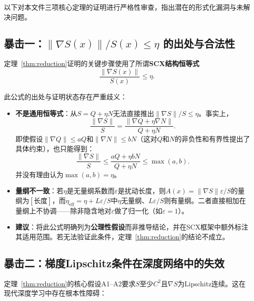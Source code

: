 \documentclass[12pt,a4paper]{article}
\newcommand{\eff}{\mathrm{eff}}
\begin{document}
以下对本文件三项核心定理的证明进行严格性审查，指出潜在的形式化漏洞与未解决问题。

\subsection{暴击一：$\|\nabla S(x)\|/S(x) \leq \eta$ 的出处与合法性}
\label{crit:scx-identity}

定理~\ref{thm:reduction}证明的关键步骤使用了所谓\textbf{SCX结构恒等式}
\[
\frac{\|\nabla S(x)\|}{S(x)} \leq \eta.
\]

此公式的出处与证明状态存在严重歧义：

\begin{itemize}
  \item \textbf{不是通用恒等式}：从$S = Q + \eta N$无法直接推出$\|\nabla S\|/S \leq \eta$。事实上，
  \[
  \frac{\|\nabla S\|}{S} = \frac{\|\nabla Q + \eta \nabla N\|}{Q + \eta N}.
  \]
  即使假设$\|\nabla Q\| \leq a Q$和$\|\nabla N\| \leq b N$（这对$Q$和$N$的非负性和有界性提出了具体约束），也只能得到：
  \[
  \frac{\|\nabla S\|}{S} \leq \frac{a Q + \eta b N}{Q + \eta N} \leq \max(a, b).
  \]
  并没有理由认为$\max(a, b) = \eta$。

  \item \textbf{量纲不一致}：若$\eta$是无量纲系数而$\varepsilon$是扰动长度，则$A(x) = \|\nabla S\|\varepsilon/S$的量纲为$[\text{长度}]$，而$\eta_{\eff} = \eta + L\varepsilon/S$中$\eta$无量纲、$L\varepsilon/S$则有量纲。二者直接相加在量纲上不协调——除非隐含地对$\varepsilon$做了归一化（如$\varepsilon = 1$）。

  \item \textbf{建议}：将此公式明确列为\textbf{公理性假设}而非推导结论，并在SCX框架中额外标注其适用范围。若无法验证此条件，定理~\ref{thm:reduction}的结论不成立。
\end{itemize}

\subsection{暴击二：梯度Lipschitz条件在深度网络中的失效}
\label{crit:relu}

定理~\ref{thm:reduction}的核心假设A1--A2要求$S$至少$C^2$且$\nabla S$为Lipschitz连续。这在现代深度学习中存在根本性障碍：
\end{document}
